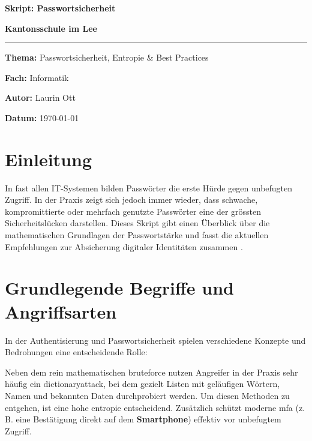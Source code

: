 \documentclass[12pt,a4paper]{article}
\begin{document}
\begin{titlepage}
    \centering
    \vspace*{2cm}
    
    {\Huge \textbf{Skript: Passwortsicherheit} \par}
    \vspace{1.5cm}
    {\Large \textbf{Kantonsschule im Lee} \par}
    \vspace{2cm}
    
    \rule{\linewidth}{0.5mm}
    \vspace{2cm}
    
    {\large \textbf{Thema:} Passwortsicherheit, Entropie \& Best Practices \par}
    \vspace{0.5cm}
    {\large \textbf{Fach:} Informatik \par}
    \vspace{0.5cm}
    {\large \textbf{Autor:} Laurin Ott \par}
    
    \vfill
    
    {\large \textbf{Datum:} \today \par}
\end{titlepage}

\newpage
\tableofcontents
\newpage

\section{Einleitung}
In fast allen IT-Systemen bilden Passwörter die erste Hürde gegen unbefugten Zugriff. In der Praxis zeigt sich jedoch immer wieder, dass schwache, kompromittierte oder mehrfach genutzte Passwörter eine der grössten Sicherheitslücken darstellen. Dieses Skript gibt einen Überblick über die mathematischen Grundlagen der Passwortstärke und fasst die aktuellen Empfehlungen zur Absicherung digitaler Identitäten zusammen \cite{nist2024}.

\section{Grundlegende Begriffe und Angriffsarten}
In der Authentisierung und Passwortsicherheit spielen verschiedene Konzepte und Bedrohungen eine entscheidende Rolle:

Neben dem rein mathematischen \gls{bruteforce} nutzen Angreifer in der Praxis sehr häufig ein \gls{dictionaryattack}, bei dem gezielt Listen mit geläufigen Wörtern, Namen und bekannten Daten durchprobiert werden. Um diesen Methoden zu entgehen, ist eine hohe \gls{entropie} entscheidend. Zusätzlich schützt moderne \gls{mfa} (z.\,B. eine Bestätigung direkt auf dem \textbf{Smartphone}) effektiv vor unbefugtem Zugriff.
\end{document}
